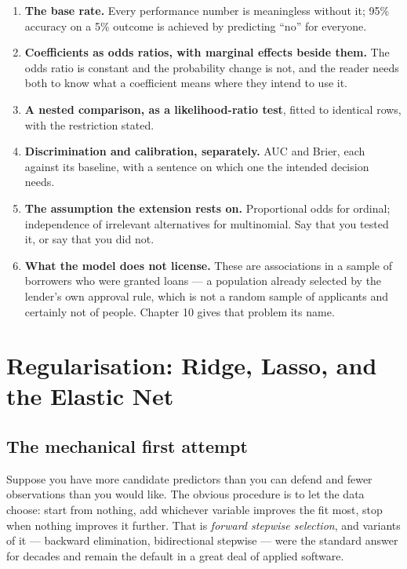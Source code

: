 \documentclass[
  letterpaper,
  10pt,
  twoside,
  openright,
  numbers=noenddot,
  chapterprefix=true]{scrbook}
\providecommand{\tightlist}{%
  \setlength{\itemsep}{0pt}\setlength{\parskip}{0pt}}
\begin{document}
\begin{enumerate}
\def\labelenumi{\arabic{enumi}.}
\tightlist
\item
  \textbf{The base rate.} Every performance number is meaningless
  without it; 95\% accuracy on a 5\% outcome is achieved by predicting
  ``no'' for everyone.
\item
  \textbf{Coefficients as odds ratios, with marginal effects beside
  them.} The odds ratio is constant and the probability change is not,
  and the reader needs both to know what a coefficient means where they
  intend to use it.
\item
  \textbf{A nested comparison, as a likelihood-ratio test}, fitted to
  identical rows, with the restriction stated.
\item
  \textbf{Discrimination and calibration, separately.} AUC and Brier,
  each against its baseline, with a sentence on which one the intended
  decision needs.
\item
  \textbf{The assumption the extension rests on.} Proportional odds for
  ordinal; independence of irrelevant alternatives for multinomial. Say
  that you tested it, or say that you did not.
\item
  \textbf{What the model does not license.} These are associations in a
  sample of borrowers who were granted loans --- a population already
  selected by the lender's own approval rule, which is not a random
  sample of applicants and certainly not of people. Chapter 10 gives
  that problem its name.
\end{enumerate}


\chapter{Regularisation: Ridge, Lasso, and the Elastic
Net}\label{regularisation-ridge-lasso-and-the-elastic-net}

\section{The mechanical first
attempt}\label{the-mechanical-first-attempt}

Suppose you have more candidate predictors than you can defend and fewer
observations than you would like. The obvious procedure is to let the
data choose: start from nothing, add whichever variable improves the fit
most, stop when nothing improves it further. That is \emph{forward
stepwise selection}, and variants of it --- backward elimination,
bidirectional stepwise --- were the standard answer for decades and
remain the default in a great deal of applied software.
\end{document}
